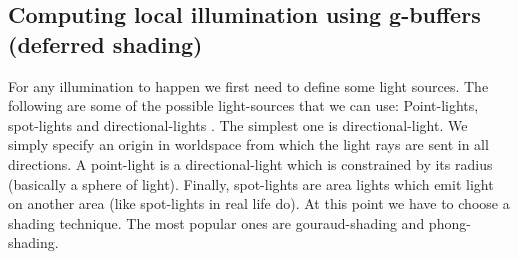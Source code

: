 \documentclass{ACGSeminar}
\begin{document}
	\subsection{Computing local illumination using g-buffers (deferred shading)}
		For any illumination to happen we first need to define some light sources. The following are some of the possible light-sources that we can use:
		Point-lights, spot-lights and directional-lights \cite{DST}. The simplest one is directional-light. We simply specify an origin in worldspace from which the light rays are sent in all directions. A point-light is a directional-light which is constrained by its radius (basically a sphere of light). Finally, spot-lights are area lights which emit light on another area (like spot-lights in real life do). 
		At this point we have to choose a shading technique. The most popular ones are gouraud-shading and phong-shading. \\\\
\end{document}
